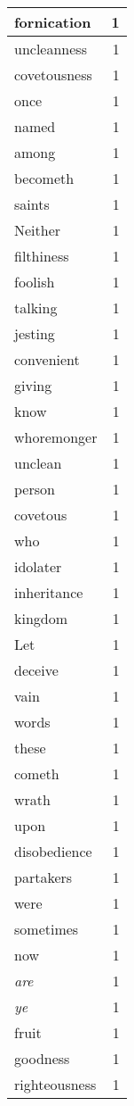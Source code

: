 \begin{center}
\begin{longtable}{l|r}
fornication & 1\\ \hline 
uncleanness & 1\\ \hline 
covetousness & 1\\ \hline 
once & 1\\ \hline 
named & 1\\ \hline 
among & 1\\ \hline 
becometh & 1\\ \hline 
saints & 1\\ \hline 
Neither & 1\\ \hline 
filthiness & 1\\ \hline 
foolish & 1\\ \hline 
talking & 1\\ \hline 
jesting & 1\\ \hline 
convenient & 1\\ \hline 
giving & 1\\ \hline 
know & 1\\ \hline 
whoremonger & 1\\ \hline 
unclean & 1\\ \hline 
person & 1\\ \hline 
covetous & 1\\ \hline 
who & 1\\ \hline 
idolater & 1\\ \hline 
inheritance & 1\\ \hline 
kingdom & 1\\ \hline 
Let & 1\\ \hline 
deceive & 1\\ \hline 
vain & 1\\ \hline 
words & 1\\ \hline 
these & 1\\ \hline 
cometh & 1\\ \hline 
wrath & 1\\ \hline 
upon & 1\\ \hline 
disobedience & 1\\ \hline 
partakers & 1\\ \hline 
were & 1\\ \hline 
sometimes & 1\\ \hline 
now & 1\\ \hline 
\emph{are} & 1\\ \hline 
\emph{ye} & 1\\ \hline 
fruit & 1\\ \hline 
goodness & 1\\ \hline 
righteousness & 1\\ \hline 

\end{longtable}
\end{center}

